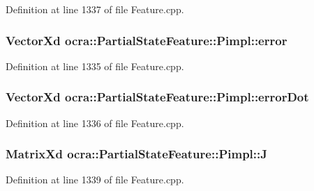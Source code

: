 Definition at line 1337 of file Feature.\+cpp.

\subsubsection[{\texorpdfstring{error}{error}}]{\setlength{\rightskip}{0pt plus 5cm}Vector\+Xd ocra\+::\+Partial\+State\+Feature\+::\+Pimpl\+::error}\hypertarget{structocra_1_1PartialStateFeature_1_1Pimpl_a92618339173100da4f1759fca1c5de69}{}\label{structocra_1_1PartialStateFeature_1_1Pimpl_a92618339173100da4f1759fca1c5de69}


Definition at line 1335 of file Feature.\+cpp.

\subsubsection[{\texorpdfstring{error\+Dot}{errorDot}}]{\setlength{\rightskip}{0pt plus 5cm}Vector\+Xd ocra\+::\+Partial\+State\+Feature\+::\+Pimpl\+::error\+Dot}\hypertarget{structocra_1_1PartialStateFeature_1_1Pimpl_a761ba2024bc9792be9d3317ac0e7006e}{}\label{structocra_1_1PartialStateFeature_1_1Pimpl_a761ba2024bc9792be9d3317ac0e7006e}


Definition at line 1336 of file Feature.\+cpp.

\subsubsection[{\texorpdfstring{J}{J}}]{\setlength{\rightskip}{0pt plus 5cm}Matrix\+Xd ocra\+::\+Partial\+State\+Feature\+::\+Pimpl\+::J}\hypertarget{structocra_1_1PartialStateFeature_1_1Pimpl_aa1bea74398a6c6774e4178c9a07585fc}{}\label{structocra_1_1PartialStateFeature_1_1Pimpl_aa1bea74398a6c6774e4178c9a07585fc}


Definition at line 1339 of file Feature.\+cpp.

